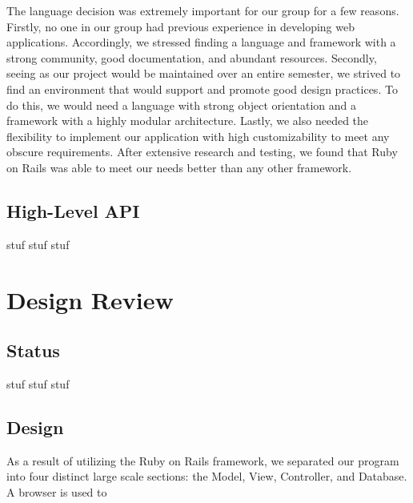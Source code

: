 \documentclass[11pt]{article}
\begin{document}

The language decision was extremely important for our group for a few reasons. Firstly, no one in our group had previous experience in developing web applications. Accordingly, we stressed finding a language and framework with a strong community, good documentation, and abundant resources. Secondly, seeing as our project would be maintained over an entire semester, we strived to find an environment that would support and promote good design practices. To do this, we would need a language with strong object orientation and a framework with a highly modular architecture. Lastly, we also needed the flexibility to implement our application with high customizability to meet any obscure requirements. After extensive research and testing, we found that Ruby on Rails was able to meet our needs better than any other framework. 



\subsection{High-Level API}

stuf stuf stuf

\section{Design Review}

\subsection{Status}

stuf stuf stuf

\subsection{Design}

As a result of utilizing the Ruby on Rails framework, we separated our program into four distinct large scale sections: the Model, View, Controller, and Database.  A browser is used to 
\end{document}
